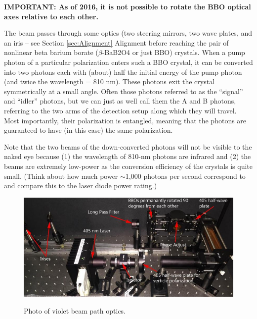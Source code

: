 \documentclass{../lab}
\begin{document}
\textbf{IMPORTANT: As of 2016, it is not possible to rotate the BBO optical axes relative to each other.}

The beam passes through some optics (two steering mirrors, two wave plates, and an iris -- see Section \ref{sec:Alignment} Alignment before reaching the pair of nonlinear beta barium borate ($\beta$-BaB2O4 or just BBO) crystals. When a pump photon of a particular polarization enters such a BBO crystal, it can be converted into two photons each with (about) half the initial energy of the pump photon (and twice the wavelength = 810 nm). These photons exit the crystal symmetrically at a small angle. Often those photons referred to as the ``signal'' and ``idler'' photons, but we can just as well call them the A and B photons, referring to the two arms of the detection setup along which they will travel. Most importantly, their polarization is entangled, meaning that the photons are guaranteed to have (in this case) the same polarization.

Note that the two beams of the down-converted photons will not be visible to the naked eye because (1) the wavelength of 810-nm photons are infrared and (2) the beams are extremely low-power as the conversion efficiency of the crystals is quite small. (Think about how much power $\sim$1,000 photons per second correspond to and compare this to the laser diode power rating.)

\begin{figure}[h]
    \centering
    \href{http://experimentationlab.berkeley.edu/sites/default/files/qie_optics_image_0.jpg}{\includegraphics[width=0.7\linewidth]{images/qie_optics_image_0.jpg}}
    \caption{Photo of violet beam path optics.}
    \label{fig:qie_optics_image_0}
\end{figure}
\end{document}
